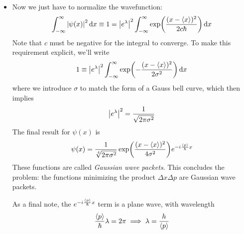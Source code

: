 \documentclass[11pt, a4paper]{article}
\newcommand{\diff}{\mathop{}\!\mathrm{d}} %
\begin{document}
\begin{itemize}
	\item Now we just have to normalize the wavefunction:
	\begin{equation*}
		\int_{-\infty}^{\infty} \abs{\psi(x)}^{2} \diff x \equiv 1 = \abs{e^{\lambda}}^{2} \int_{-\infty}^{\infty}\exp(\frac{(x - \ev{x})^{2}}{2c\hbar})\diff x
	\end{equation*}
	Note that $ c $ must be negative for the integral to converge. To make this requirement explicit, we'll write
	\begin{equation*}
		1 \equiv  \abs{e^{\lambda}}^{2} \int_{-\infty}^{\infty}\exp(-\frac{(x - \ev{x})^{2}}{2\sigma^{2}})\diff x
	\end{equation*}
	where we introduce $ \sigma $ to match the form of a Gauss bell curve, which then implies
	\begin{equation*}
		\abs{e^{\lambda}}^{2} = \frac{1}{\sqrt{2\pi \sigma^{2}}}
	\end{equation*}
	The final result for $ \psi(x) $ is
	\begin{equation*}
		\psi(x) = \frac{1}{\sqrt[4]{2\pi \sigma^{2}}} \exp(\frac{(x - \ev{x})^{2}}{4 \sigma^{2}})e^{-i\frac{\ev{p}}{\hbar}x}
	\end{equation*}
	These functions are called \textit{Gaussian wave packets}. This concludes the problem: the functions minimizing the product $ \Delta x \Delta p $ are Gaussian wave packets. 
	
	As a final note, the $ e^{-i\frac{\ev{p}}{\hbar}x} $ term is a plane wave, with wavelength
	\begin{equation*}
		\frac{\ev{p}}{\hbar} \lambda = 2\pi \implies \lambda = \frac{h}{\ev{p}}
	\end{equation*}
	
\end{itemize}
\end{document}
